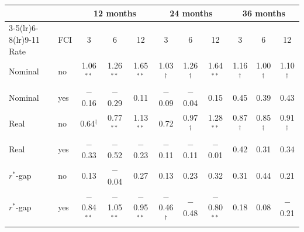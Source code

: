 \begin{tabular}{llccccccccc}
\toprule
 & & \multicolumn{3}{c}{12 months} & \multicolumn{3}{c}{24 months} & \multicolumn{3}{c}{36 months}\\
\cmidrule(lr){3-5}\cmidrule(lr){6-8}\cmidrule(lr){9-11}
Rate & FCI & 3 & 6 & 12 & 3 & 6 & 12 & 3 & 6 & 12 \\
\midrule
Nominal & no & 1.06$^{**}$ & 1.26$^{**}$ & 1.65$^{**}$ & 1.03$^{\dagger}$ & 1.26$^{\dagger}$ & 1.64$^{**}$ & 1.16$^{\dagger}$ & 1.00$^{\dagger}$ & 1.10$^{\dagger}$ \\
Nominal & yes & $-$0.16 & $-$0.29 & 0.11 & $-$0.09 & $-$0.04 & 0.15 & 0.45 & 0.39 & 0.43 \\
\midrule
Real & no & 0.64$^{\dagger}$ & 0.77$^{**}$ & 1.13$^{**}$ & 0.72 & 0.97$^{\dagger}$ & 1.28$^{**}$ & 0.87$^{\dagger}$ & 0.85$^{\dagger}$ & 0.91$^{\dagger}$ \\
Real & yes & $-$0.33 & $-$0.52 & $-$0.23 & $-$0.11 & $-$0.11 & $-$0.01 & 0.42 & 0.31 & 0.34 \\
\midrule
$r^*$-gap & no & 0.13 & $-$0.04 & 0.27 & 0.13 & 0.23 & 0.32 & 0.31 & 0.44 & 0.21 \\
$r^*$-gap & yes & $-$0.84$^{**}$ & $-$1.05$^{**}$ & $-$0.95$^{**}$ & $-$0.46$^{\dagger}$ & $-$0.48 & $-$0.80$^{**}$ & 0.18 & 0.08 & $-$0.21 \\
\bottomrule
\end{tabular}
